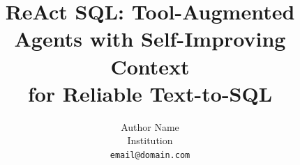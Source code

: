 \documentclass[11pt,twocolumn]{article}
\title{ReAct SQL: Tool-Augmented Agents with Self-Improving Context \\for Reliable Text-to-SQL}
\author{
  Author Name \\
  Institution \\
  \texttt{email@domain.com}
}
\begin{document}
\pagestyle{plain}

\maketitle

\begin{abstract}

\end{abstract}









\end{document}
